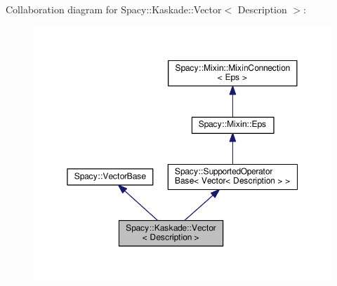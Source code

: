 Collaboration diagram for Spacy\+:\+:Kaskade\+:\+:Vector$<$ Description $>$\+:\nopagebreak
\begin{figure}[H]
\begin{center}
\leavevmode
\includegraphics[width=350pt]{classSpacy_1_1Kaskade_1_1Vector__coll__graph}
\end{center}
\end{figure}
